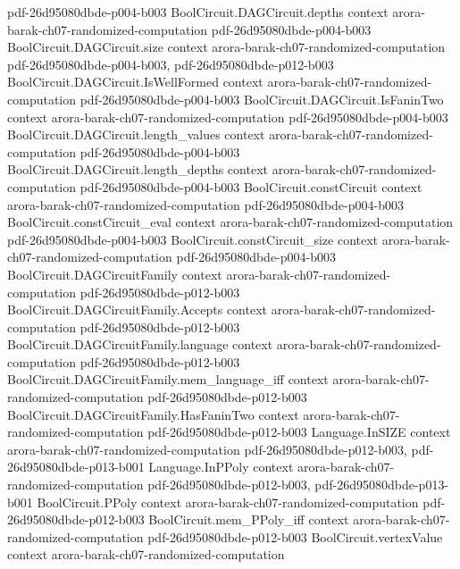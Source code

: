 \begin{theorem}
  {pdf-26d95080dbde-p004-b003}
\proofstep
  {BoolCircuit.DAGCircuit.depths}
  {context}
  {arora-barak-ch07-randomized-computation}
  {pdf-26d95080dbde-p004-b003}
\proofstep
  {BoolCircuit.DAGCircuit.size}
  {context}
  {arora-barak-ch07-randomized-computation}
  {pdf-26d95080dbde-p004-b003,
    pdf-26d95080dbde-p012-b003}
\proofstep
  {BoolCircuit.DAGCircuit.IsWellFormed}
  {context}
  {arora-barak-ch07-randomized-computation}
  {pdf-26d95080dbde-p004-b003}
\proofstep
  {BoolCircuit.DAGCircuit.IsFaninTwo}
  {context}
  {arora-barak-ch07-randomized-computation}
  {pdf-26d95080dbde-p004-b003}
\proofstep
  {BoolCircuit.DAGCircuit.length_values}
  {context}
  {arora-barak-ch07-randomized-computation}
  {pdf-26d95080dbde-p004-b003}
\proofstep
  {BoolCircuit.DAGCircuit.length_depths}
  {context}
  {arora-barak-ch07-randomized-computation}
  {pdf-26d95080dbde-p004-b003}
\proofstep
  {BoolCircuit.constCircuit}
  {context}
  {arora-barak-ch07-randomized-computation}
  {pdf-26d95080dbde-p004-b003}
\proofstep
  {BoolCircuit.constCircuit_eval}
  {context}
  {arora-barak-ch07-randomized-computation}
  {pdf-26d95080dbde-p004-b003}
\proofstep
  {BoolCircuit.constCircuit_size}
  {context}
  {arora-barak-ch07-randomized-computation}
  {pdf-26d95080dbde-p004-b003}
\proofstep
  {BoolCircuit.DAGCircuitFamily}
  {context}
  {arora-barak-ch07-randomized-computation}
  {pdf-26d95080dbde-p012-b003}
\proofstep
  {BoolCircuit.DAGCircuitFamily.Accepts}
  {context}
  {arora-barak-ch07-randomized-computation}
  {pdf-26d95080dbde-p012-b003}
\proofstep
  {BoolCircuit.DAGCircuitFamily.language}
  {context}
  {arora-barak-ch07-randomized-computation}
  {pdf-26d95080dbde-p012-b003}
\proofstep
  {BoolCircuit.DAGCircuitFamily.mem_language_iff}
  {context}
  {arora-barak-ch07-randomized-computation}
  {pdf-26d95080dbde-p012-b003}
\proofstep
  {BoolCircuit.DAGCircuitFamily.HasFaninTwo}
  {context}
  {arora-barak-ch07-randomized-computation}
  {pdf-26d95080dbde-p012-b003}
\proofstep
  {Language.InSIZE}
  {context}
  {arora-barak-ch07-randomized-computation}
  {pdf-26d95080dbde-p012-b003,
    pdf-26d95080dbde-p013-b001}
\proofstep
  {Language.InPPoly}
  {context}
  {arora-barak-ch07-randomized-computation}
  {pdf-26d95080dbde-p012-b003,
    pdf-26d95080dbde-p013-b001}
\proofstep
  {BoolCircuit.PPoly}
  {context}
  {arora-barak-ch07-randomized-computation}
  {pdf-26d95080dbde-p012-b003}
\proofstep
  {BoolCircuit.mem_PPoly_iff}
  {context}
  {arora-barak-ch07-randomized-computation}
  {pdf-26d95080dbde-p012-b003}
\proofstep
  {BoolCircuit.vertexValue}
  {context}
  {arora-barak-ch07-randomized-computation}

\end{theorem}
